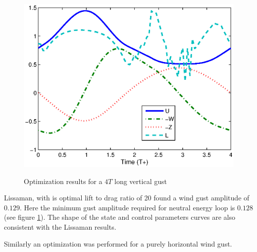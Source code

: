 \begin{figure}[ht]
  \begin{center}	
    \scalebox{1.0}
    {\includegraphics{./Figures/Windtype=1_Tg=4_Wg=0p129_quad_G=20.eps}}
  \end{center}
  \caption{Optimization results for a $4T$ long vertical gust}
  \label{fig:Validation_optimization}
\end{figure}

\FloatBarrier

Lissaman, with is optimal lift to drag ratio of 20 found a wind gust amplitude of $0.129$. 
Here the minimum gust amplitude required for neutral energy loop is $0.128$ (see figure \ref{fig:Validation_optimization}).
The shape of the state and control parameters curves are also consistent with the Lissaman results.

\par Similarly an optimization was performed for a purely horizontal wind gust.


